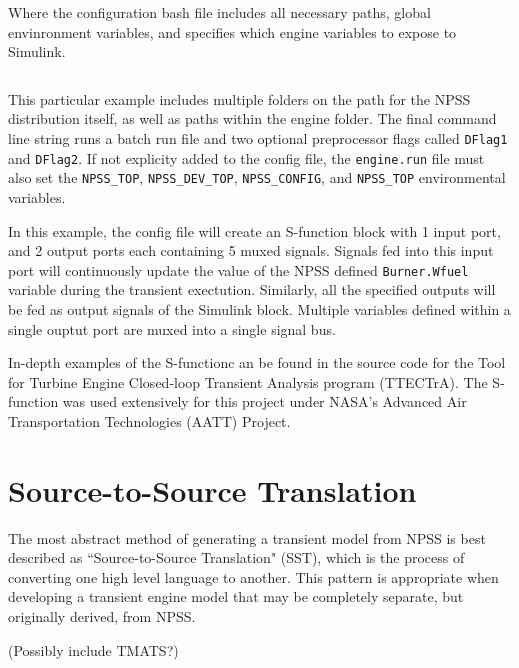 \documentclass[heading.tex]{subfiles}
\begin{document}
Where the configuration bash file includes all necessary paths, global envinronment variables, and specifies
which engine variables to expose to Simulink.

 \begin{adjustwidth}{-1cm}{-1cm}
 \inputminted[]{bash}{code/engineConfig.bat}
 \end{adjustwidth} 

This particular example includes multiple folders on the path for the NPSS distribution itself,
as well as paths within the engine folder.
The final command line string runs a batch run file and two optional preprocessor flags called \texttt{DFlag1}
and \texttt{DFlag2}. If not explicity added to the config file, the \texttt{engine.run} file must also set
the \texttt{NPSS\_TOP}, \texttt{NPSS\_DEV\_TOP}, \texttt{NPSS\_CONFIG}, and \texttt{NPSS\_TOP} environmental variables.

In this example, the config file will create an S-function block with 1 input port,
and 2 output ports each containing 5 muxed signals.
Signals fed into this input port will continuously update the value of the NPSS defined \texttt{Burner.Wfuel}
variable during the transient exectution. Similarly, all the specified outputs will be fed as output
signals of the Simulink block.
Multiple variables defined within a single ouptut port are muxed into a single signal bus.


In-depth examples of the S-functionc an be found in the source code for the
Tool for Turbine Engine Closed-loop Transient Analysis program (TTECTrA). \cite{TTECTrA}
The S-function was used extensively for this project under
NASA's Advanced Air Transportation Technologies (AATT) Project.

\section{Source-to-Source Translation}

The most abstract method of generating a transient model from NPSS is best described as ``Source-to-Source Translation"
(SST), which is the process of converting one high level language to another. This pattern is appropriate when developing
a transient engine model that may be completely separate, but originally derived, from NPSS.


(Possibly include TMATS?)
\end{document}
